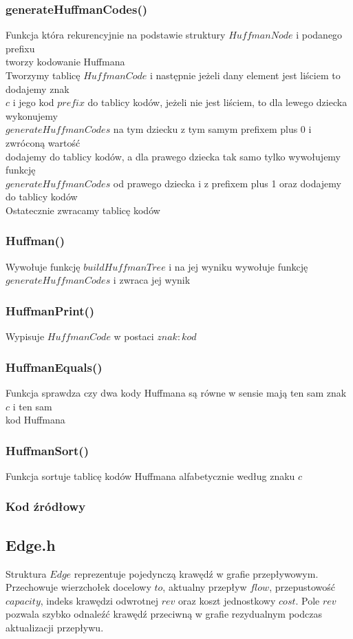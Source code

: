 \documentclass{article}
\begin{document}
\subsubsection{generateHuffmanCodes()}
Funkcja która rekurencyjnie na podstawie struktury $HuffmanNode$ i podanego prefixu \\ tworzy kodowanie Huffmana \\ Tworzymy tablicę $HuffmanCode$ i następnie jeżeli dany element jest liściem to dodajemy znak \\ $c$ i jego kod $prefix$ do tablicy kodów, jeżeli nie jest liściem, to dla lewego dziecka wykonujemy \\ $generateHuffmanCodes$ na tym dziecku z tym samym prefixem plus 0 i zwróconą wartość \\ dodajemy do tablicy kodów, a dla prawego dziecka tak samo tylko wywołujemy funkcję \\ $generateHuffmanCodes$ od prawego dziecka i z prefixem plus 1 oraz dodajemy do tablicy kodów \\ Ostatecznie zwracamy tablicę kodów
\subsubsection{Huffman()}
Wywołuje funkcję $buildHuffmanTree$ i na jej wyniku wywołuje funkcję \\ $generateHuffmanCodes$ i zwraca jej wynik
\subsubsection{HuffmanPrint()}
Wypisuje $HuffmanCode$ w postaci $znak: kod$
\subsubsection{HuffmanEquals()}
Funkcja sprawdza czy dwa kody Huffmana są równe w sensie mają ten sam znak $c$ i ten sam \\ kod Huffmana
\subsubsection{HuffmanSort()}
Funkcja sortuje tablicę kodów Huffmana alfabetycznie według znaku $c$
\subsubsection{Kod źródłowy}


\subsection{Edge.h}
Struktura $Edge$ reprezentuje pojedynczą krawędź w grafie przepływowym. Przechowuje wierzchołek docelowy $to$, aktualny przepływ $flow$, przepustowość $capacity$, indeks krawędzi odwrotnej $rev$ oraz koszt jednostkowy $cost$. Pole $rev$ pozwala szybko odnaleźć krawędź przeciwną w grafie rezydualnym podczas aktualizacji przepływu.

\end{document}
